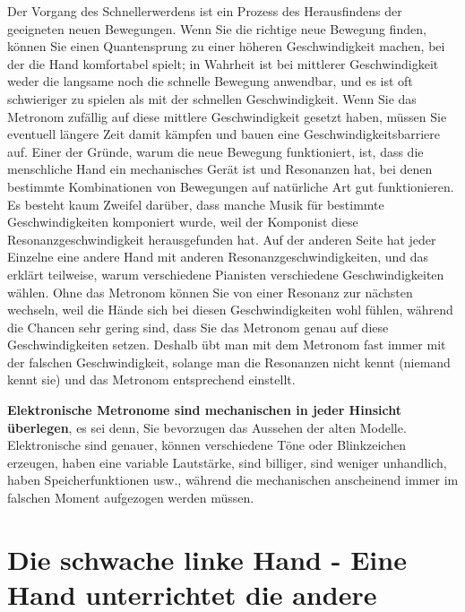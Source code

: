 Der Vorgang des Schnellerwerdens ist ein Prozess des Herausfindens der geeigneten neuen Bewegungen.
Wenn Sie die richtige neue Bewegung finden, können Sie einen Quantensprung zu einer höheren Geschwindigkeit machen, bei der die Hand komfortabel spielt; in Wahrheit ist bei mittlerer Geschwindigkeit weder die langsame noch die schnelle Bewegung anwendbar, und es ist oft schwieriger zu spielen als mit der schnellen Geschwindigkeit.
Wenn Sie das Metronom zufällig auf diese mittlere Geschwindigkeit gesetzt haben, müssen Sie eventuell längere Zeit damit kämpfen und bauen eine Geschwindigkeitsbarriere auf.
Einer der Gründe, warum die neue Bewegung funktioniert, ist, dass die menschliche Hand ein mechanisches Gerät ist und Resonanzen hat, bei denen bestimmte Kombinationen von Bewegungen auf natürliche Art gut funktionieren.
Es besteht kaum Zweifel darüber, dass manche Musik für bestimmte Geschwindigkeiten komponiert wurde, weil der Komponist diese Resonanzgeschwindigkeit herausgefunden hat.
Auf der anderen Seite hat jeder Einzelne eine andere Hand mit anderen Resonanzgeschwindigkeiten, und das erklärt teilweise, warum verschiedene Pianisten verschiedene Geschwindigkeiten wählen.
Ohne das Metronom können Sie von einer Resonanz zur nächsten wechseln, weil die Hände sich bei diesen Geschwindigkeiten wohl fühlen, während die Chancen sehr gering sind, dass Sie das Metronom genau auf diese Geschwindigkeiten setzen.
Deshalb übt man mit dem Metronom fast immer mit der falschen Geschwindigkeit, solange man die Resonanzen nicht kennt (niemand kennt sie) und das Metronom entsprechend einstellt.

\textbf{Elektronische Metronome sind mechanischen in jeder Hinsicht überlegen}, es sei denn, Sie bevorzugen das Aussehen der alten Modelle.
Elektronische sind genauer, können verschiedene Töne oder Blinkzeichen erzeugen, haben eine variable Lautstärke, sind billiger, sind weniger unhandlich, haben Speicherfunktionen usw., während die mechanischen anscheinend immer im falschen Moment aufgezogen werden müssen.


\section{Die schwache linke Hand - Eine Hand unterrichtet die andere}\hypertarget{c1ii20}{}

